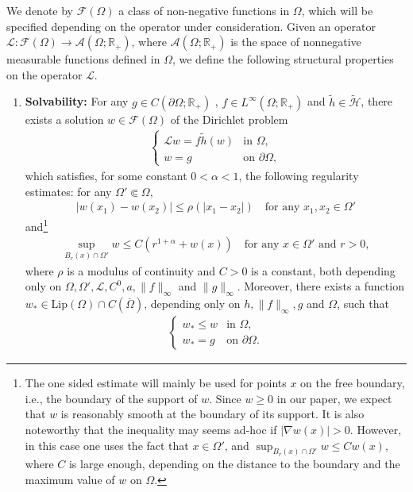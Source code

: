 \documentclass[11pt,oneside,english]{amsart}
\newcommand{\R}{{\mathbb R}}
\newcommand{\cL}{{\mathcal L}}
\newcommand{\cA}{{\mathcal A}}
\newcommand{\cF}{{\mathcal F}}
\newcommand{\al}{\alpha}
\numberwithin{equation}{section}
\theoremstyle{plain}
\numberwithin{equation}{section}
\begin{document}
\medskip


We denote by $\mathcal F(\Omega)$ a class of non-negative functions in $\Omega$, which will be specified depending on the operator under consideration. 
Given an operator $\cL:\cF(\Omega)\to \mathcal{A}(\Omega;\R_+)$, where $\cA(\Omega;\R_+)$ is the space of nonnegative measurable functions defined in $\Omega$,  we define the following structural properties on the operator $\cL$. 



\begin{enumerate}[label={\bf (PE\arabic*)}]
    \item\label{cond-sol} {\bf Solvability:}  For any $ g\in C(\partial\Omega;\R_+)$ , $f\in L^\infty(\Omega;\R_+)$ and $\tilde h\in\widetilde{\mathcal H}$, there exists a solution $w\in \cF(\Omega)$ of the Dirichlet problem 
    \begin{align}\label{eq:sol-Dir}
        \begin{cases}
            \cL w=f\tilde h(w)&\text{in }\Omega,\\
            w=g&\text{on }\partial\Omega,
        \end{cases}
    \end{align}
    which satisfies, for some  constant $0<\al<1$,  
    the following regularity estimates: for any $\Omega'\Subset\Omega$,
    \begin{align}\label{eq:mod-conti}
        |w(x_1)-w(x_2)|\le\rho(|x_1-x_2|)\quad\text{for any }x_1,x_2\in\Omega'
    \end{align}
    and\footnote{The one sided estimate will mainly be used for points $x$ on the free boundary, i.e., the boundary of the support of $w$. 
    Since $w\geq 0$ in our paper, we expect  that $w$ is reasonably smooth at the boundary of its support. It is also noteworthy that the inequality may seems ad-hoc if $|\nabla w (x) | > 0$. However, in this case one uses  the fact that $x \in \Omega'$, and  
    $\sup_{B_r(x)\cap\Omega'}w\le Cw(x)$, where $C$ is large enough, depending on the distance to the boundary and the maximum value of $w $ on $\Omega$. }
    \begin{align}
        \label{eq:ftn-space}
        \sup_{B_r(x)\cap\Omega'}w\le C(r^{1+\al}+w(x))\quad\text{for any }x\in \Omega'\text{ and }r>0,
    \end{align}  
        where  $\rho$ is a modulus of continuity and $C>0$ is a constant, both depending only on $\Omega,\Omega',\cL, C^0,a,\|f\|_\infty$ and $\|g\|_\infty$. Moreover, there exists a function $w_*\in \text{Lip}(\Omega)\cap C(\overline{\Omega})$, depending only on $h,\|f\|_\infty, g$ and $\Omega$, such that
        \begin{align}\label{eq:lower-bound}
            \begin{cases}
                w_*\le w&\text{in }\Omega,\\
                w_*=g&\text{on }\partial\Omega.
            \end{cases}
        \end{align}



\end{enumerate}
\end{document}
